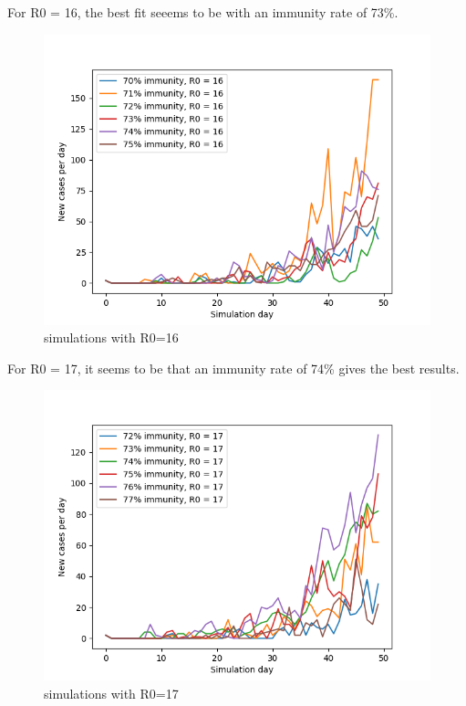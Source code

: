\documentclass[runningheads]{llncs}
\begin{document}
For R0 = 16, the best fit seeems to be with an immunity rate of 73\%.
\begin{figure}
	\includegraphics[width=\textwidth]{test_R0_16.png}
	\caption{simulations with R0=16}
\end{figure}

\newpage
\noindent

For R0 = 17, it seems to be that an immunity rate of 74\%  gives the best results.
\begin{figure}
	\includegraphics[width=\textwidth]{test_R0_17.png}
	\caption{simulations with R0=17}
\end{figure}

\newpage
\noindent
\end{document}
